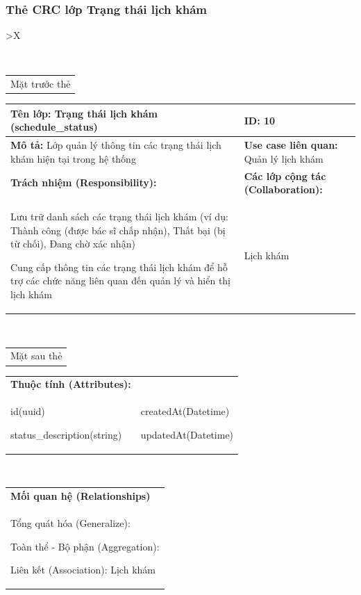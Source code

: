 \cleardoublepage

\subsubsection{Thẻ CRC lớp Trạng thái lịch khám}

\begin{xltabular}{\textwidth}{
		>{\centering\arraybackslash}X
	}
	\caption{\bfseries \fontsize{12pt}{0pt}\selectfont Thẻ CRC lớp Trạng thái lịch khám}
	\\
	\begin{tabularx}{0.9\textwidth}{X}
		Mặt trước thẻ
	\end{tabularx}
	\begin{tabularx}{0.9\textwidth}{|X|X|}
		\hline
		\textbf{Tên lớp:} Trạng thái lịch khám (schedule\_status)                              & \textbf{ID:} 10                                 \\
		\hline
		\textbf{Mô tả:} Lớp quản lý thông tin các trạng thái lịch khám hiện tại trong hệ thống & \textbf{Use case liên quan:}  Quản lý lịch khám \\
		\hline
		\textbf{Trách nhiệm (Responsibility):}                                                 & \textbf{Các lớp cộng tác (Collaboration):}      \\
		Lưu trữ danh sách các trạng thái lịch khám (ví dụ: Thành công (được bác sĩ chấp nhận), Thất bại (bị từ chối), Đang chờ xác nhận)

		Cung cấp thông tin các trạng thái lịch khám để hỗ trợ các chức năng liên quan đến quản lý và hiển thị lịch khám
		                                                                                       &
		Lịch khám
		\\
		\hline
	\end{tabularx}
	\\
	\begin{tabularx}{0.9\textwidth}{X}
		Mặt sau thẻ
	\end{tabularx}
	\begin{tabularx}{0.9\textwidth}{|X|X|}
		\hline
		\textbf{Thuộc tính (Attributes):} & \\
		id(uuid)

		status\_description(string)
		                                  &
		createdAt(Datetime)

		updatedAt(Datetime)
		\\ \hline
	\end{tabularx}
	\\
	\begin{tabularx}{0.9\textwidth}{|X|}
		\hline
		\textbf{Mối quan hệ (Relationships)} \\
		Tổng quát hóa (Generalize):

		Toàn thể - Bộ phận (Aggregation):

		Liên kết (Association): Lịch khám
		\\
		\hline
	\end{tabularx}
\end{xltabular}

